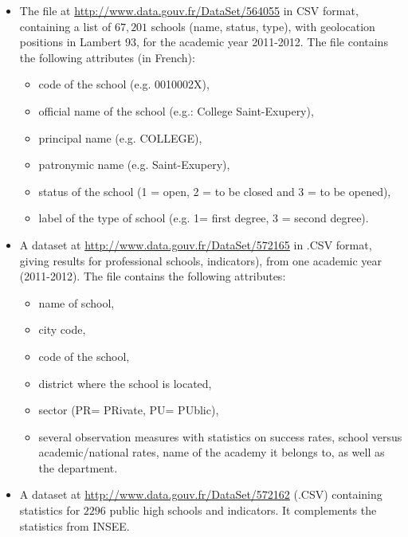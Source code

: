 \begin{itemize}
\item The file at \url{http://www.data.gouv.fr/DataSet/564055} in CSV format, containing a list of $67, 201$ schools (name, status, type), with geolocation positions in Lambert 93, for the academic year 2011-2012. The file contains the following attributes (in French):
	\begin{itemize}
		\item code of the school (e.g. 0010002X),
		\item  official name of the school (e.g.: College Saint-Exupery),
		\item principal name (e.g. COLLEGE),
		\item patronymic name (e.g. Saint-Exupery),
		\item status of the school (1 = open, 2 = to be closed and 3 = to be opened),
		\item label of the type of school (e.g. 1= first degree, 3 = second degree).
	\end{itemize}
\item A dataset at \url{http://www.data.gouv.fr/DataSet/572165} in .CSV format, giving results for professional schools, indicators), from one academic year (2011-2012). The file contains the following attributes:
	\begin{itemize}
		\item name of school,
		\item  city code,
		\item code of the school,
		\item district where the school is located,
		\item sector (PR= PRivate, PU= PUblic),
		\item several observation measures with statistics on success rates, school versus academic/national rates, name of the academy it belongs to, as well as the department.
	\end{itemize}
   \item A dataset at \url{http://www.data.gouv.fr/DataSet/572162} (.CSV) containing statistics for  $2296$ public high schools and indicators. It complements the statistics from INSEE.
\end{itemize}


